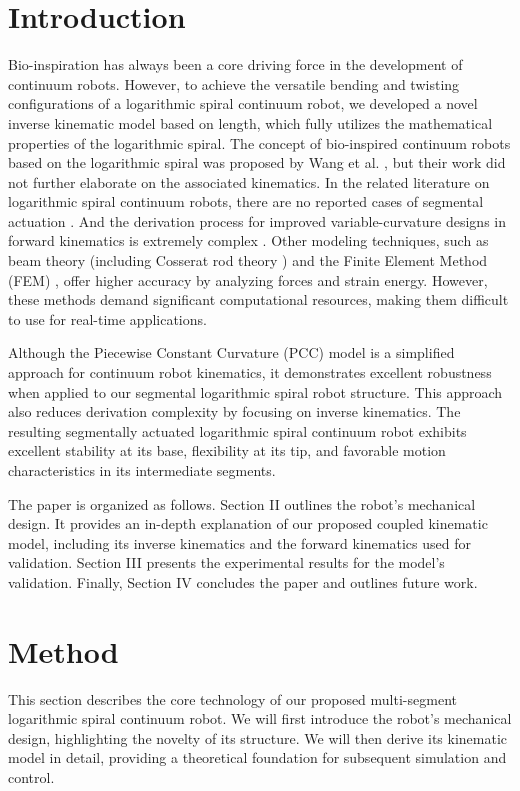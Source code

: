 \documentclass[conference]{IEEEtran}
\begin{document}

\section{Introduction}
Bio-inspiration has always been a core driving force in the development of continuum robots. However, to achieve the versatile bending and twisting configurations of a logarithmic spiral continuum robot, we developed a novel inverse kinematic model based on length, which fully utilizes the mathematical properties of the logarithmic spiral. The concept of bio-inspired continuum robots based on the logarithmic spiral was proposed by Wang et al. \cite{b1}, but their work did not further elaborate on the associated kinematics. In the related literature on logarithmic spiral continuum robots, there are no reported cases of segmental actuation \cite{b2}. And the derivation process for improved variable-curvature designs in forward kinematics is extremely complex \cite{b3}. Other modeling techniques, such as beam theory (including Cosserat rod theory \cite{b4}\cite{b5}) and the Finite Element Method (FEM) \cite{b6}, offer higher accuracy by analyzing forces and strain energy. However, these methods demand significant computational resources, making them difficult to use for real-time applications. 

Although the Piecewise Constant Curvature (PCC) model is a simplified approach for continuum robot kinematics, it demonstrates excellent robustness when applied to our segmental logarithmic spiral robot structure. This approach also reduces derivation complexity by focusing on inverse kinematics. The resulting segmentally actuated logarithmic spiral continuum robot exhibits excellent stability at its base, flexibility at its tip, and favorable motion characteristics in its intermediate segments.

The paper is organized as follows. Section II outlines the robot's mechanical design. It provides an in-depth explanation of our proposed coupled kinematic model, including its inverse kinematics and the forward kinematics used for validation. Section III presents the experimental results for the model's validation. Finally, Section IV concludes the paper and outlines future work.


\section{Method}
This section describes the core technology of our proposed multi-segment logarithmic spiral continuum robot. We will first introduce the robot's mechanical design, highlighting the novelty of its structure. We will then derive its kinematic model in detail, providing a theoretical foundation for subsequent simulation and control.
\end{document}
